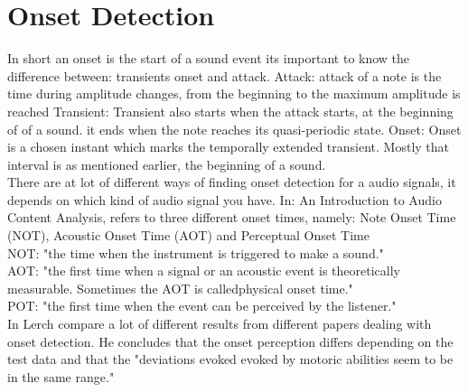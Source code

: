 \section{Onset Detection}
In short an onset is the start of a sound event \cite{ACA} 
its important to know the difference between: transients onset and attack. 
Attack: attack of a note is the time during amplitude changes, from the beginning to the maximum amplitude is reached \cite{ACA}
Transient: Transient also starts when the attack starts, at the beginning of of a sound. it ends when the note reaches its quasi-periodic state. \cite{ACA}
Onset: Onset is a chosen instant which marks the temporally extended transient. \cite{Bello2005} Mostly that interval is as mentioned earlier, the beginning of a sound. 
\\
There are at lot of different ways of  finding onset detection for a audio signals, it depends on which kind of audio signal you have.
In: An Introduction to Audio Content Analysis, \cite{ACA} refers to three different onset times, namely: Note Onset Time (NOT), Acoustic Onset Time (AOT) and Perceptual Onset Time 
\\
NOT: "the time when the instrument is triggered to make a sound." \cite{ACA}
\\
AOT: "the first time when a signal or an acoustic event is theoretically measurable. Sometimes the AOT is calledphysical onset time." \cite{ACA}
\\
POT: "the first time when the event can be perceived by the
listener." \cite{ACA}
\\
In \cite{ACA} Lerch compare a lot of different results from different papers dealing with onset detection. He concludes that the onset perception differs depending on the test data and that the "deviations evoked evoked by motoric abilities seem to be in the same range." \cite{ACA}
\\

